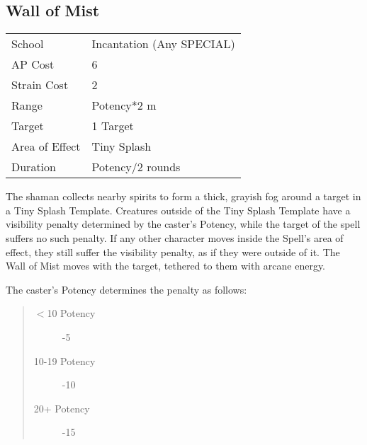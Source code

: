 \documentclass[11pt,a4paper,twocolumn]{book}
\begin{document}
\subsection*{Wall of Mist}
{
	\begin{tabu} to 75mm{| X[l,4] | X[l,7] |}
		\hline
		School         & Incantation (Any SPECIAL) \\
		AP Cost        & 6                         \\
		Strain Cost    & 2                         \\
		Range          & Potency*2 m               \\
		Target         & 1 Target                  \\
		Area of Effect & Tiny Splash               \\
		Duration       & Potency/2 rounds          \\ \hline
	\end{tabu}
	
}

\medskip

The shaman collects nearby spirits to form a thick, grayish fog around a target in a Tiny Splash Template. Creatures outside of the Tiny Splash Template have a visibility penalty determined by the caster's Potency, while the target of the spell suffers no such penalty. If any other character moves inside the Spell's area of effect, they still suffer the visibility penalty, as if they were outside of it. The Wall of Mist moves with the target, tethered to them with arcane energy.

The caster's Potency determines the penalty as follows:

\begin{quote}
	\begin{description}
		\item[$<$10 Potency] 	-5
		\item[10-19 Potency] 	-10
		\item[20+ Potency] 		-15 
	\end{description}
\end{quote}
\end{document}
